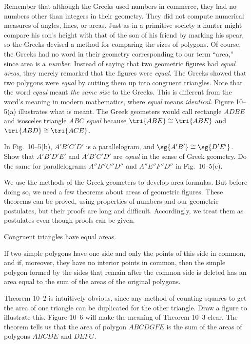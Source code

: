 \documentclass[11pt]{book}
\theoremstyle{bkplain}
\theoremstyle{XIplainnote}
\theoremstyle{bkplain}
\theoremstyle{bkplain}
\begin{document}
Remember that although the Greeks used numbers in commerce, they had no numbers
other than integers in their geometry. They did not compute numerical measures
of angles, lines, or areas. Just as in a primitive society a hunter might
compare his son's height with that of the son of his friend by marking his
spear, so the Greeks devised a method for comparing the sizes of polygons. Of
course, the Greeks had no word in their geometry corresponding to our term
``area,'' since area is a \emph{number}. Instead of saying that two geometric
figures had \emph{equal areas}, they merely remarked that the figures were
\emph{equal}. The Greeks showed that two polygons were \emph{equal} by cutting
them up into congruent triangles. Note that the word \emph{equal} meant
\emph{the same size} to the Greeks. This is different from the word's meaning
in modern mathematics, where \emph{equal} means \emph{identical}. Figure
10--5(a) illustrates what is meant. The Greek geometers would call rectangle
$ADBE$ and isosceles triangle $ABC$ \emph{equal} because
$\tri{ABE} \cong \tri{ABE}$ and $\tri{ABD} \cong \tri{ACE}$.

\FIGXFIVE

\noindent In Fig.~10--5(b), $A'B'C'D'$ is a parallelogram, and
$\sg{A'B'} \cong \sg{D'E'}$. Show that $A'B'D'E'$ and $A'B'C'D'$ are
\emph{equal} in the sense of Greek geometry. Do the same for parallelograms
$A''B''C''D''$ and $A''E''F''D''$ in Fig.~10--5(c).

\medskip
We use the methods of the Greek geometers to develop area formulas. But before
doing so, we need a few theorems about areas of geometric figures. These
theorems can be proved, using properties of numbers and our geometric
postulates, but their proofs are long and difficult. Accordingly, we treat them
as postulates even though proofs can be given.

\begin{theorem}
Congruent triangles have equal areas.
\end{theorem}

\begin{theorem}
If two simple polygons have one side and only the points of this side in
common, and if, moreover, they have no interior points in common, then the
simple polygon formed by the sides that remain after the common side is
deleted has an area equal to the sum of the areas of the original polygons.
\end{theorem}

Theorem 10--2 is intuitively obvious, since any method of counting squares to
get the area of one triangle can be duplicated for the other triangle. Draw a
figure to illustrate this. Figure 10--6 will make the meaning of Theorem 10--3
clear. The theorem tells us that the area of polygon $ABCDGFE$ is the sum of
the areas of polygons $ABCDE$ and $DEFG$.
\end{document}
